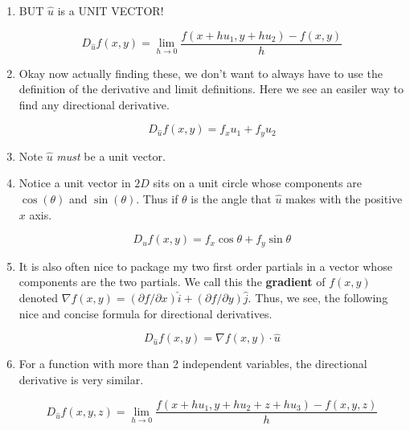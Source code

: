 \documentclass[11pt]{article}
\begin{document}
\begin{enumerate}
\begin{equation*}
    \lim_{h \to 0} \frac{f(x+hu_1,y+hu_2)-f(x,y)}{h \sqrt{(u_1)^2+(u_2)^2}} =   \lim_{h \to 0} \frac{f(x+hu_1,y+hu_2)-f(x,y)}{h |\hat{u}| }
\end{equation*}

\item BUT $\hat{u}$ is a UNIT VECTOR!

\begin{equation*}
    D_{\hat{u}}f(x,y) = \lim_{h \to 0} \frac{f(x+hu_1,y+hu_2)-f(x,y)}{h}
\end{equation*}

\item Okay now actually finding these, we don't want to always have to use the definition of the derivative and limit definitions. Here we see an easiler way to find any directional derivative.

\begin{equation*}
    D_{\hat{u}} f(x,y) = f_x u_1 + f_y u_2
\end{equation*}

\item  Note $\hat{u}$ \emph{must} be a unit vector.

\item Notice a unit vector in $2D$ sits on a unit circle whose components are $\cos(\theta)$ and $\sin(\theta)$. Thus if $\theta$ is the angle that $\hat{u}$ makes with the positive $x$ axis.

\begin{equation*}
    D_{\hat{u}}f(x,y) = f_x\cos{\theta} + f_y \sin{\theta}
\end{equation*}

\item It is also often nice to package my two first order partials in a vector whose components are the two partials. We call this the \textbf{gradient} of $f(x,y)$ denoted $\nabla f(x,y) = (\partial f/\partial x ) \hat{i} + (\partial f/\partial y ) \hat{j}$. Thus, we see, the following nice and concise formula for directional derivatives.

\begin{equation*}
    D_{\hat{u}} f(x,y) = \nabla f(x,y) \cdot \hat{u}
\end{equation*}

\item For a function with more than 2 independent variables, the directional derivative is very similar.

\begin{equation*}
    D_{\hat{u}}f(x,y,z) = \lim_{h\to 0} \frac{f(x+hu_1, y+ hu_2 + z + hu_3) -f(x,y,z)}{h}
\end{equation*}


\end{enumerate}
\end{document}
